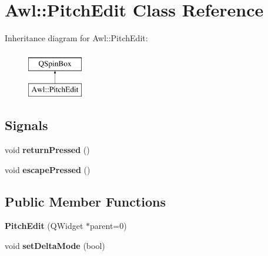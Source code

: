 \hypertarget{class_awl_1_1_pitch_edit}{}\section{Awl\+:\+:Pitch\+Edit Class Reference}
\label{class_awl_1_1_pitch_edit}
Inheritance diagram for Awl\+:\+:Pitch\+Edit\+:\begin{figure}[H]
\begin{center}
\leavevmode
\includegraphics[height=2.000000cm]{class_awl_1_1_pitch_edit}
\end{center}
\end{figure}
\subsection*{Signals}
\begin{DoxyCompactItemize}
\item 
\mbox{\label{class_awl_1_1_pitch_edit_ae0f26d3ed866e1f95d5287e16675d381}} 
void {\bfseries return\+Pressed} ()
\item 
\mbox{\label{class_awl_1_1_pitch_edit_aea5cfbed167d485c51b138e34abfdf01}} 
void {\bfseries escape\+Pressed} ()
\end{DoxyCompactItemize}
\subsection*{Public Member Functions}
\begin{DoxyCompactItemize}
\item 
\mbox{\label{class_awl_1_1_pitch_edit_a0348537ac0b219075833e59dc9503886}} 
{\bfseries Pitch\+Edit} (Q\+Widget $\ast$parent=0)
\item 
\mbox{\label{class_awl_1_1_pitch_edit_a254bbcd01c63366280f47f919d020f2c}} 
void {\bfseries set\+Delta\+Mode} (bool)
\end{DoxyCompactItemize}
